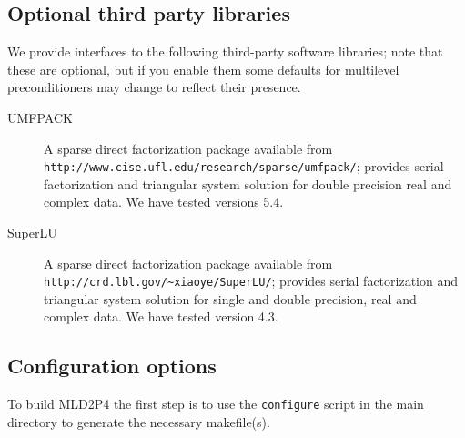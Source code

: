 \subsection{Optional third party libraries}

We provide interfaces to the following third-party software libraries;
note that these are optional, but if you enable them some defaults
for multilevel preconditioners may change to reflect their presence. 

\begin{description}
\item[UMFPACK] \cite{UMFPACK}
  A sparse direct factorization package available from \\ 
  \verb|http://www.cise.ufl.edu/research/sparse/umfpack/|; 
  provides serial factorization and triangular system solution for double
  precision real and complex data. We have tested
  versions 5.4. 
\item[SuperLU] \cite{SUPERLU}
  A sparse direct factorization package available from \\
  \verb|http://crd.lbl.gov/~xiaoye/SuperLU/|; provides serial
  factorization and triangular system solution for single and double precision,
  real and complex data. We have tested version 4.3.
\end{description}
\subsection{Configuration options}

To build  MLD2P4 the first step is to use the \verb|configure| script
in the main directory to generate the necessary makefile(s). 

